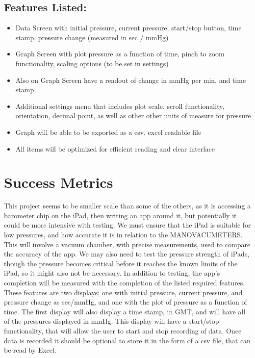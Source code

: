 \documentclass[onecolumn, draftclsnofoot,10pt, compsoc]{IEEEtran}
\begin{document}
\subsection{Features Listed:}
\begin{itemize}
\item Data Screen with initial pressure, current pressure, start/stop button, time stamp, pressure change (measured in sec / mmHg)
\item Graph Screen with plot pressure as a function of time, pinch to zoom functionality, scaling options (to be set in settings)
\item Also on Graph Screen have a readout of change in mmHg per min, and time stamp
\item Additional settings menu that includes plot scale, scroll functionality, orientation, decimal point, as well as other other units of measure for pressure
\item Graph will be able to be exported as a csv, excel readable file
\item All items will be optimized for efficient reading and clear interface
\end{itemize}

\section{Success Metrics} 
This project seems to be smaller scale than some of the others, as it is accessing a barometer chip on the iPad, then writing an app around it, but potentially it could be more intensive with testing.
We must ensure that the iPad is suitable for low pressures, and how accurate it is in relation to the MANOVACUMETERS.
This will involve a vacuum chamber, with precise measurements, used to compare the accuracy of the app.
We may also need to test the pressure strength of iPads, though the pressure becomes critical before it reaches the known limits of the iPad, so it might also not be necessary.
In addition to testing, the app's completion will be measured with the completion of the listed required features.
These features are two displays; one with initial pressure, current pressure, and pressure change as sec/mmHg, and one with the plot of pressure as a function of time.
The first display will also display a time stamp, in GMT, and will have all of the pressures displayed in mmHg.
This display will have a start/stop functionality, that will allow the user to start and stop recording of data.
Once data is recorded it should be optional to store it in the form of a csv file, that can be read by Excel.
\end{document}
